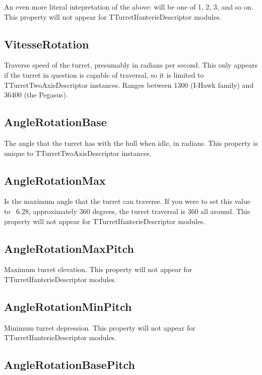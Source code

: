 \documentclass{article}
\begin{document}
An even more literal intepretation of the above: will be one of 1, 2, 3, and so on. This property will not appear for TTurretIfanterieDescriptor modules.

\subsection{VitesseRotation}

Traverse speed of the turret, presumably in radians per second. This only appears if the turret in question is capable of traversal, so it is limited to TTurretTwoAxisDescriptor instances. Ranges between 1300 (I-Hawk family) and 36400 (the Pegasus).

\subsection{AngleRotationBase}

The angle that the turret has with the hull when idle, in radians. This property is unique to TTurretTwoAxisDescriptor instances.

\subsection{AngleRotationMax}

Is the maximum angle that the turret can traverse. If you were to set this value to ~6.28, approximately 360 degrees, the turret traversal is 360 all around. This property will not appear for TTurretIfanterieDescriptor modules.

\subsection{AngleRotationMaxPitch}

Maximum turret elevation. This property will not appear for TTurretIfanterieDescriptor modules.

\subsection{AngleRotationMinPitch}

Minimum turret depression. This property will not appear for TTurretIfanterieDescriptor modules.

\subsection{AngleRotationBasePitch}
\end{document}
